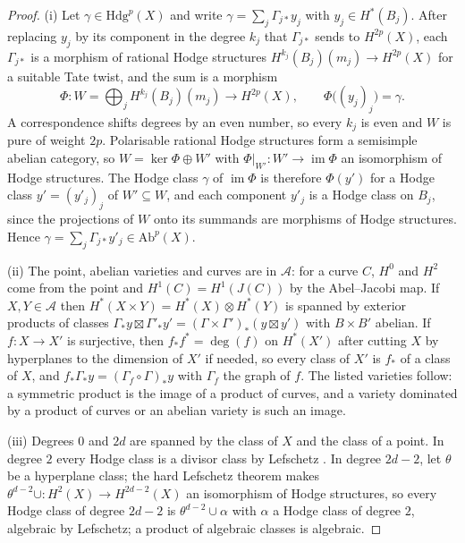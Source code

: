 \documentclass[11pt,reqno]{amsart}
\numberwithin{equation}{section}
\theoremstyle{plain}
\theoremstyle{definition}
\newcommand{\Hdg}{\mathrm{Hdg}}
\newcommand{\Ab}{\mathrm{Ab}}
\begin{document}
\begin{proof}
(i) Let $\gamma\in\Hdg^{p}(X)$ and write $\gamma=\sum_{j}\Gamma_{j*}y_{j}$ with $y_{j}\in H^{*}(B_{j})$. After replacing $y_{j}$ by its component in the degree $k_{j}$ that $\Gamma_{j*}$ sends to $H^{2p}(X)$, each $\Gamma_{j*}$ is a morphism of rational Hodge structures $H^{k_{j}}(B_{j})(m_{j})\to H^{2p}(X)$ for a suitable Tate twist, and the sum is a morphism
\[
\Phi\colon W=\bigoplus_{j}H^{k_{j}}(B_{j})(m_{j})\longrightarrow H^{2p}(X),\qquad \Phi\bigl((y_{j})_{j}\bigr)=\gamma .
\]
A correspondence shifts degrees by an even number, so every $k_{j}$ is even and $W$ is pure of weight $2p$. Polarisable rational Hodge structures form a semisimple abelian category, so $W=\ker\Phi\oplus W'$ with $\Phi|_{W'}\colon W'\to\operatorname{im}\Phi$ an isomorphism of Hodge structures. The Hodge class $\gamma$ of $\operatorname{im}\Phi$ is therefore $\Phi(y')$ for a Hodge class $y'=(y'_{j})_{j}$ of $W'\subseteq W$, and each component $y'_{j}$ is a Hodge class on $B_{j}$, since the projections of $W$ onto its summands are morphisms of Hodge structures. Hence $\gamma=\sum_{j}\Gamma_{j*}y'_{j}\in\Ab^{p}(X)$.

(ii) The point, abelian varieties and curves are in $\mathcal{A}$: for a curve $C$, $H^{0}$ and $H^{2}$ come from the point and $H^{1}(C)=H^{1}(J(C))$ by the Abel--Jacobi map. If $X,Y\in\mathcal{A}$ then $H^{*}(X\times Y)=H^{*}(X)\otimes H^{*}(Y)$ is spanned by exterior products of classes $\Gamma_{*}y\boxtimes\Gamma'_{*}y'=(\Gamma\times\Gamma')_{*}(y\boxtimes y')$ with $B\times B'$ abelian. If $f\colon X\to X'$ is surjective, then $f_{*}f^{*}=\deg(f)$ on $H^{*}(X')$ after cutting $X$ by hyperplanes to the dimension of $X'$ if needed, so every class of $X'$ is $f_{*}$ of a class of $X$, and $f_{*}\Gamma_{*}y=(\Gamma_{f}\circ\Gamma)_{*}y$ with $\Gamma_{f}$ the graph of $f$. The listed varieties follow: a symmetric product is the image of a product of curves, and a variety dominated by a product of curves or an abelian variety is such an image.

(iii) Degrees $0$ and $2d$ are spanned by the class of $X$ and the class of a point. In degree $2$ every Hodge class is a divisor class by Lefschetz \cite{Lef24}. In degree $2d-2$, let $\theta$ be a hyperplane class; the hard Lefschetz theorem makes $\theta^{d-2}\cup\colon H^{2}(X)\to H^{2d-2}(X)$ an isomorphism of Hodge structures, so every Hodge class of degree $2d-2$ is $\theta^{d-2}\cup\alpha$ with $\alpha$ a Hodge class of degree $2$, algebraic by Lefschetz; a product of algebraic classes is algebraic.
\end{proof}
\end{document}
